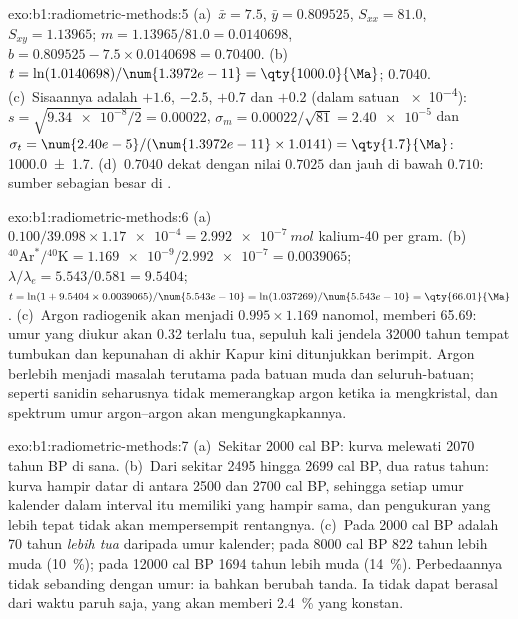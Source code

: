\begin{solution}{exo:b1:radiometric-methods:5}
(a)~$\bar x = 7.5$, $\bar y = 0.809525$, $S_{xx} = 81.0$, $S_{xy} = 1.13965$;
$m = 1.13965/81.0 = 0.0140698$, $b = 0.809525 - 7.5 \times 0.0140698 = 0.70400$.
(b)~$t = \ln(1.0140698)/\num{1.3972e-11} = \qty{1000.0}{\Ma}$; 
$0.7040$. (c)~Sisaannya adalah $+1.6$, $-2.5$, $+0.7$ dan $+0.2$ (dalam satuan
\num{e-4}): $s = \sqrt{\num{9.34e-8}/2} = 0.00022$, $\sigma_m = 0.00022/\sqrt{81}
= \num{2.40e-5}$ dan $\sigma_t = \num{2.40e-5}/(\num{1.3972e-11} \times 1.0141) =
\qty{1.7}{\Ma}$: \qty[uncertainty-mode=separate]{1000.0(17)}{\Ma}. (d)~$0.7040$
dekat dengan nilai  $0.7025$ dan jauh di bawah  $0.710$: sumber sebagian besar
di .
\end{solution}

\begin{solution}{exo:b1:radiometric-methods:6}
(a)~$0.100/39.098 \times \num{1.17e-4} = \qty{2.992e-7}{mol}$ kalium-40 per gram.
(b)~${}^{40}\mathrm{Ar}^*/{}^{40}\mathrm{K} = \num{1.169e-9}/\num{2.992e-7}
= 0.0039065$; $\lambda/\lambda_e = 5.543/0.581 = 9.5404$; $t = \ln(1 + 9.5404
\times 0.0039065)/\num{5.543e-10} = \ln(1.037269)/\num{5.543e-10} =
\qty{66.01}{\Ma}$. (c)~Argon radiogenik akan menjadi $0.995 \times 1.169$
nanomol, memberi \qty{65.69}{\Ma}: umur yang diukur akan \qty{0.32}{\Ma} terlalu tua,
sepuluh kali jendela \num{32000} tahun tempat tumbukan dan kepunahan di akhir Kapur kini
ditunjukkan berimpit. Argon berlebih menjadi masalah terutama pada batuan muda dan
seluruh-batuan;  seperti sanidin seharusnya tidak memerangkap argon ketika ia
mengkristal, dan spektrum umur argon--argon akan mengungkapkannya.
\end{solution}

\begin{solution}{exo:b1:radiometric-methods:7}
(a)~Sekitar \num{2000} cal BP: kurva melewati \num{2070} tahun BP di sana.
(b)~Dari sekitar \num{2495} hingga \num{2699} cal BP, dua ratus tahun: kurva hampir datar
di antara \num{2500} dan \num{2700} cal BP, sehingga setiap umur kalender dalam interval
itu memiliki  yang hampir sama, dan pengukuran yang lebih tepat tidak akan
mempersempit rentangnya. (c)~Pada \num{2000} cal BP  adalah \num{70} tahun
\emph{lebih tua} daripada umur kalender; pada \num{8000} cal BP \num{822} tahun lebih muda
(\qty{10}{\percent}); pada \num{12000} cal BP \num{1694} tahun lebih muda
(\qty{14}{\percent}). Perbedaannya tidak sebanding dengan umur: ia bahkan berubah tanda. Ia
tidak dapat berasal dari waktu paruh saja, yang akan memberi \qty{2.4}{\percent} yang
konstan.
\end{solution}

